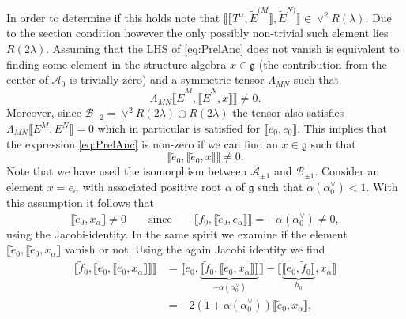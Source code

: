 In order to determine if this holds note that $\llbracket\llbracket T^\alpha ,\tilde{E}^{(M}\rrbracket,\tilde{E}^{N)}\rrbracket\in \vee^2R(\lambda)$. Due to the section condition however the only possibly non-trivial such element lies $R(2\lambda)$. Assuming that the LHS of \eqref{eq:PrelAnc} does not vanish is equivalent to finding some element in the structure algebra $x\in\mathfrak{g}$ (the contribution from the center of $\mathscr{A}_0$ is trivially zero) and a symmetric tensor $\Lambda_{MN}$ such that 
\begin{equation}
    \Lambda_{MN}\llbracket \tilde{E}^M,\llbracket\tilde{E}^N,x\rrbracket\rrbracket \neq 0.
\end{equation}
Moreover, since $\mathscr{B}_{-2}=\vee^2 R(2\lambda)\ominus R(2\lambda)$ the tensor also satisfies $\Lambda_{MN}\llbracket E^{M},E^N\rrbracket=0$ which in particular is satisfied for $\llbracket e_0,e_0\rrbracket$. This implies that the expression \eqref{eq:PrelAnc} is non-zero if we can find an $x\in\mathfrak{g}$ such that
\begin{equation}
    \llbracket \tilde{e}_0,\llbracket\tilde{e}_0,x\rrbracket\rrbracket \neq 0. 
\end{equation}
Note that we have used the isomorphism between $\mathscr{A}_{\pm1}$ and $\mathscr{B}_{\pm 1}$. Consider an element $x=e_\alpha$ with associated positive root $\alpha$ of $\mathfrak{g}$ such that $\alpha(\alpha_0^\vee)< 1$. With this assumption it follows that 
\begin{equation}
    \llbracket \tilde{e}_0,x_\alpha\rrbracket \neq 0 \qquad \text{since}\qquad \llbracket \tilde{f}_0,\llbracket \tilde{e}_0,e_\alpha\rrbracket\rrbracket = -\alpha(\alpha_0^\vee)\neq 0, 
\end{equation}
using the Jacobi-identity. In the same spirit we examine if the element $\llbracket \tilde{e}_0,\llbracket \tilde{e}_0,x_\alpha\rrbracket$ vanish or not. Using the again Jacobi identity we find
\begin{equation}
    \begin{aligned}
        \llbracket \tilde{f}_0,\llbracket \tilde{e}_0,\llbracket \tilde{e}_0,x_\alpha\rrbracket\rrbracket\rrbracket  &= \llbracket \tilde{e}_0,\underbrace{\llbracket\tilde{f}_0,\llbracket \tilde{e}_0,x_\alpha\rrbracket\rrbracket}_{-\alpha(\alpha_0^\vee)}\rrbracket-\llbracket\underbrace{\llbracket \tilde{e}_0,\tilde{f}_0\rrbracket}_{h_0},x_\alpha\rrbracket\\
        &= -2(1+\alpha(\alpha_0^\vee))\llbracket \tilde{e}_0,x_\alpha\rrbracket,
    \end{aligned}
\end{equation}

